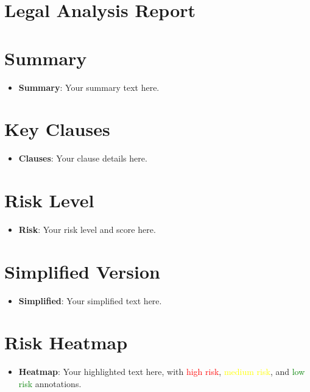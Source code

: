 \documentclass[a4paper,12pt]{article}
\begin{document}
\section*{Legal Analysis Report}

\section*{Summary}
\begin{itemize}[leftmargin=*]
\item \textbf{Summary}: Your summary text here.
\end{itemize}

\section*{Key Clauses}
\begin{itemize}[leftmargin=*]
\item \textbf{Clauses}: Your clause details here.
\end{itemize}

\section*{Risk Level}
\begin{itemize}[leftmargin=*]
\item \textbf{Risk}: Your risk level and score here.
\end{itemize}

\section*{Simplified Version}
\begin{itemize}[leftmargin=*]
\item \textbf{Simplified}: Your simplified text here.
\end{itemize}

\section*{Risk Heatmap}
\begin{itemize}[leftmargin=*]
\item \textbf{Heatmap}: Your highlighted text here, with \textcolor{red}{high risk}, \textcolor{yellow}{medium risk}, and \textcolor{green}{low risk} annotations.
\end{itemize}
\end{document}
